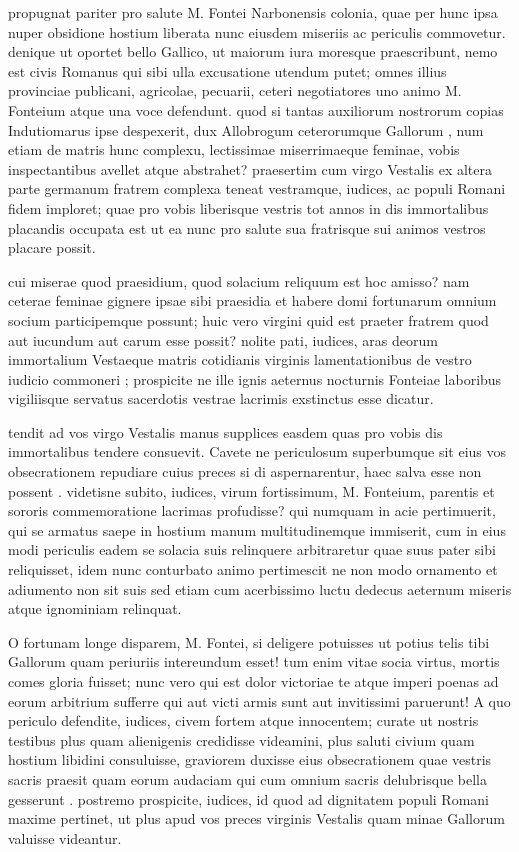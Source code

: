 propugnat pariter pro salute M. Fontei Narbonensis colonia, quae per hunc ipsa nuper obsidione hostium liberata nunc eiusdem miseriis ac periculis commovetur. denique ut oportet bello Gallico, ut maiorum iura moresque praescribunt, nemo est civis Romanus qui sibi ulla excusatione utendum putet; omnes illius provinciae publicani, agricolae, pecuarii, ceteri negotiatores uno animo M. Fonteium atque una voce defendunt. quod si tantas auxiliorum nostrorum copias Indutiomarus ipse despexerit, dux Allobrogum ceterorumque Gallorum , num etiam de matris hunc complexu, lectissimae miserrimaeque feminae, vobis inspectantibus avellet atque abstrahet? praesertim cum virgo Vestalis ex altera parte germanum fratrem complexa teneat vestramque, iudices, ac populi Romani fidem imploret; quae pro vobis liberisque vestris tot annos in dis immortalibus placandis occupata est ut ea nunc pro salute sua fratrisque sui animos vestros placare possit.

 cui miserae quod praesidium, quod solacium reliquum est hoc amisso? nam ceterae feminae gignere ipsae sibi praesidia et habere domi fortunarum omnium socium participemque possunt; huic vero virgini quid est praeter fratrem quod aut iucundum aut carum esse possit? nolite pati, iudices, aras deorum immortalium Vestaeque matris cotidianis virginis lamentationibus de vestro iudicio commoneri ; prospicite ne ille ignis aeternus nocturnis Fonteiae laboribus vigiliisque servatus sacerdotis vestrae lacrimis exstinctus esse dicatur.

 tendit ad vos virgo Vestalis manus supplices easdem quas pro vobis dis immortalibus tendere consuevit. Cavete ne periculosum superbumque sit eius vos obsecrationem repudiare cuius preces si di aspernarentur, haec salva esse non possent . videtisne subito, iudices, virum fortissimum, M. Fonteium, parentis et sororis commemoratione lacrimas profudisse? qui numquam in acie pertimuerit, qui se armatus saepe in hostium manum multitudinemque immiserit, cum in eius modi periculis eadem se solacia suis relinquere arbitraretur quae suus pater sibi reliquisset, idem nunc conturbato animo pertimescit ne non modo ornamento et adiumento non sit suis sed etiam cum acerbissimo luctu dedecus aeternum miseris atque ignominiam relinquat.

 O fortunam longe disparem, M. Fontei, si deligere potuisses ut potius telis tibi Gallorum quam periuriis intereundum esset! tum enim vitae socia virtus, mortis comes gloria fuisset; nunc vero qui est dolor victoriae te atque imperi poenas ad eorum arbitrium sufferre qui aut victi armis sunt aut invitissimi paruerunt! A quo periculo defendite, iudices, civem fortem atque innocentem; curate ut nostris testibus plus quam alienigenis credidisse videamini, plus saluti civium quam hostium libidini consuluisse, graviorem duxisse eius obsecrationem quae vestris sacris praesit quam eorum audaciam qui cum omnium sacris delubrisque bella gesserunt . postremo prospicite, iudices, id quod ad dignitatem populi Romani maxime pertinet, ut plus apud vos preces virginis Vestalis quam minae Gallorum valuisse videantur.
